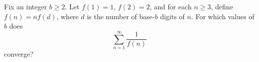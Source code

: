 Fix an integer $b \geq 2$. Let $f(1) = 1$, $f(2) = 2$, and for each
$n \geq 3$, define $f(n) = n f(d)$, where $d$ is the number of
base-$b$ digits of $n$. For which values of $b$ does
\[
\sum_{n=1}^\infty \frac{1}{f(n)}
\]
converge?
